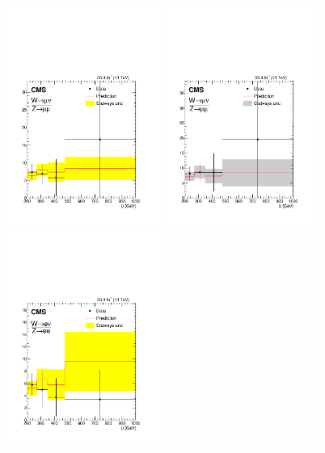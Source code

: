 \begin{figure}
\centering
\includegraphics[width=0.45\textwidth]{figures/pullsImpact/ratio_wmn_zmm_shapes_prefit.pdf}
\includegraphics[width=0.45\textwidth]{figures/pullsImpact/ratio_wmn_zmm_shapes_fit_b.pdf}\\
\includegraphics[width=0.45\textwidth]{figures/pullsImpact/ratio_wen_zee_shapes_prefit.pdf}

\end{figure}
